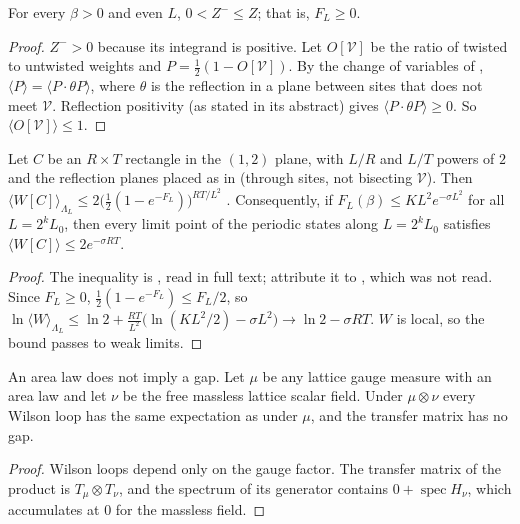 \begin{lemma}\label{neg:lem-Zminus}
For every $\beta>0$ and even $L$, $0<Z^-\le Z$; that is, $F_L\ge0$.
\end{lemma}

\begin{proof}
$Z^->0$ because its integrand is positive. Let $O[\mathcal V]$ be the ratio of twisted to
untwisted weights and $P=\frac12(1-O[\mathcal V])$. By the change of variables of
\cite[(4), (7)]{KT02}, $\langle P\rangle=\langle P\cdot\theta P\rangle$, where $\theta$ is the
reflection in a plane between sites that does not meet $\mathcal V$. Reflection positivity
\cite{OS78} (as stated in its abstract) gives $\langle P\cdot\theta P\rangle\ge0$. So
$\langle O[\mathcal V]\rangle\le1$.
\end{proof}

\begin{proposition}\label{neg:prop-arealaw}
Let $C$ be an $R\times T$ rectangle in the $(1,2)$ plane, with $L/R$ and $L/T$ powers of $2$
and the reflection planes placed as in \cite{KT02} (through sites, not bisecting $\mathcal V$).
Then $\langle W[C]\rangle_{\Lambda_L}\le2\bigl(\tfrac12(1-e^{-F_L})\bigr)^{RT/L^2}$
\cite[(11)]{KT02}. Consequently, if $F_L(\beta)\le KL^2e^{-\sigma L^2}$ for all $L=2^kL_0$, then
every limit point of the periodic states along $L=2^kL_0$ satisfies
$\langle W[C]\rangle\le2e^{-\sigma RT}$.
\end{proposition}

\begin{proof}
The inequality is \cite[(11)]{KT02}, read in full text; \cite{KT02} attribute it
to \cite{TY85}, which was not read. Since $F_L\ge0$, $\frac12(1-e^{-F_L})\le F_L/2$, so
$\ln\langle W\rangle_{\Lambda_L}\le\ln2+\frac{RT}{L^2}\bigl(\ln(KL^2/2)-\sigma L^2\bigr)\to\ln2-\sigma RT$.
$W$ is local, so the bound passes to weak limits.
\end{proof}

\begin{proposition}\label{neg:prop-noarea}
An area law does not imply a gap. Let $\mu$ be any lattice gauge measure with an area law and
let $\nu$ be the free massless lattice scalar field. Under $\mu\otimes\nu$ every Wilson loop has
the same expectation as under $\mu$, and the transfer matrix has no gap.
\end{proposition}

\begin{proof}
Wilson loops depend only on the gauge factor. The transfer matrix of the product is
$T_\mu\otimes T_\nu$, and the spectrum of its generator contains $0+\operatorname{spec}H_\nu$,
which accumulates at $0$ for the massless field.
\end{proof}

